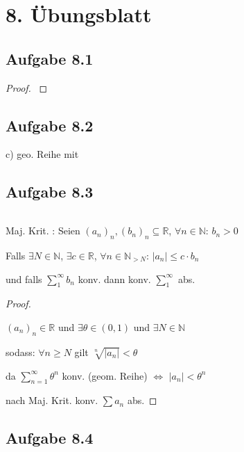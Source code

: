 \section{8. Übungsblatt}

\subsection{Aufgabe 8.1}

\begin{proof}
$ $\newline

\end{proof}

\subsection{Aufgabe 8.2}

c) geo. Reihe mit

\newpage

\subsection{Aufgabe 8.3}
$ $\newline

Maj. Krit. : Seien $(a_n)_n,(b_n)_n\subseteq\mathbb{R}$, $\forall n\in\mathbb{N}$: $b_n>0$

Falls $\exists N\in\mathbb{N}$, $\exists c\in\mathbb{R}$, $\forall n\in\mathbb{N}_{>N}$: $|a_n|\leq c\cdot b_n$

und falls $\sum_{1}^{\infty}b_n$ konv. dann konv. $\sum_{1}^{\infty}$ abs.

\begin{proof}
$ $\newline

$(a_n)_n\in\mathbb{R}$ und $\exists\theta\in(0,1)$ und $\exists N\in\mathbb{N}$

sodass: $\forall n\geq N$ gilt $\sqrt[n]{|a_n|}<\theta$

da $\sum_{n=1}^{\infty}\theta^n$ konv. (geom. Reihe) $\Leftrightarrow$ $|a_n|<\theta^n$

nach Maj. Krit. konv. $\sum a_n$ abs.
\end{proof}

\newpage

\subsection{Aufgabe 8.4}


